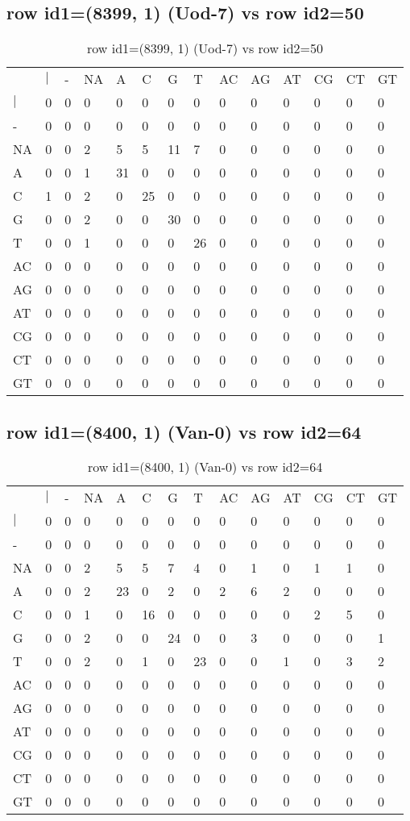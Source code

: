 \subsection{row id1=(8399, 1) (Uod-7) vs row id2=50}
\begin{center}
\begin{longtable}{|l|l|l|l|l|l|l|l|l|l|l|l|l|l|}
\caption{row id1=(8399, 1) (Uod-7) vs row id2=50} \label{table_dm660}\\
\hline
\\
\hline
&$|$&-&NA&A&C&G&T&AC&AG&AT&CG&CT&GT\\
$|$&0&0&0&0&0&0&0&0&0&0&0&0&0\\
-&0&0&0&0&0&0&0&0&0&0&0&0&0\\
NA&0&0&2&5&5&11&7&0&0&0&0&0&0\\
A&0&0&1&31&0&0&0&0&0&0&0&0&0\\
C&1&0&2&0&25&0&0&0&0&0&0&0&0\\
G&0&0&2&0&0&30&0&0&0&0&0&0&0\\
T&0&0&1&0&0&0&26&0&0&0&0&0&0\\
AC&0&0&0&0&0&0&0&0&0&0&0&0&0\\
AG&0&0&0&0&0&0&0&0&0&0&0&0&0\\
AT&0&0&0&0&0&0&0&0&0&0&0&0&0\\
CG&0&0&0&0&0&0&0&0&0&0&0&0&0\\
CT&0&0&0&0&0&0&0&0&0&0&0&0&0\\
GT&0&0&0&0&0&0&0&0&0&0&0&0&0\\
\hline
\end{longtable}
\end{center}

\subsection{row id1=(8400, 1) (Van-0) vs row id2=64}
\begin{center}
\begin{longtable}{|l|l|l|l|l|l|l|l|l|l|l|l|l|l|}
\caption{row id1=(8400, 1) (Van-0) vs row id2=64} \label{table_dm662}\\
\hline
\\
\hline
&$|$&-&NA&A&C&G&T&AC&AG&AT&CG&CT&GT\\
$|$&0&0&0&0&0&0&0&0&0&0&0&0&0\\
-&0&0&0&0&0&0&0&0&0&0&0&0&0\\
NA&0&0&2&5&5&7&4&0&1&0&1&1&0\\
A&0&0&2&23&0&2&0&2&6&2&0&0&0\\
C&0&0&1&0&16&0&0&0&0&0&2&5&0\\
G&0&0&2&0&0&24&0&0&3&0&0&0&1\\
T&0&0&2&0&1&0&23&0&0&1&0&3&2\\
AC&0&0&0&0&0&0&0&0&0&0&0&0&0\\
AG&0&0&0&0&0&0&0&0&0&0&0&0&0\\
AT&0&0&0&0&0&0&0&0&0&0&0&0&0\\
CG&0&0&0&0&0&0&0&0&0&0&0&0&0\\
CT&0&0&0&0&0&0&0&0&0&0&0&0&0\\
GT&0&0&0&0&0&0&0&0&0&0&0&0&0\\
\hline
\end{longtable}
\end{center}

